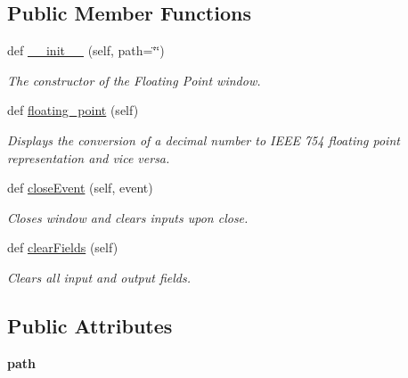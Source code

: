 \subsection*{Public Member Functions}
\begin{DoxyCompactItemize}
\item 
def \hyperlink{classfloating__point__ui_1_1_floating_point_window_ab5a1e532591e07c6ad7603c561532979}{\+\_\+\+\_\+init\+\_\+\+\_\+} (self, path=\char`\"{}\char`\"{})
\begin{DoxyCompactList}\small\item\em The constructor of the Floating Point window. \end{DoxyCompactList}\item 
def \hyperlink{classfloating__point__ui_1_1_floating_point_window_a3e36de9fde9b6387740d13a644fdfc56}{floating\+\_\+point} (self)
\begin{DoxyCompactList}\small\item\em Displays the conversion of a decimal number to I\+E\+EE 754 floating point representation and vice versa. \end{DoxyCompactList}\item 
\mbox{\label{classfloating__point__ui_1_1_floating_point_window_aa84d9d4ad3c6fca9062c7b49c6d9e37e}} 
def \hyperlink{classfloating__point__ui_1_1_floating_point_window_aa84d9d4ad3c6fca9062c7b49c6d9e37e}{close\+Event} (self, event)
\begin{DoxyCompactList}\small\item\em Closes window and clears inputs upon close. \end{DoxyCompactList}\item 
\mbox{\label{classfloating__point__ui_1_1_floating_point_window_aff0f79ab51ec2f1a373780b37848d700}} 
def \hyperlink{classfloating__point__ui_1_1_floating_point_window_aff0f79ab51ec2f1a373780b37848d700}{clear\+Fields} (self)
\begin{DoxyCompactList}\small\item\em Clears all input and output fields. \end{DoxyCompactList}\end{DoxyCompactItemize}
\subsection*{Public Attributes}
\begin{DoxyCompactItemize}
\item 
\mbox{\label{classfloating__point__ui_1_1_floating_point_window_aa40210a7ef669d041d3f4ea1880a4047}} 
{\bfseries path}
\end{DoxyCompactItemize}


